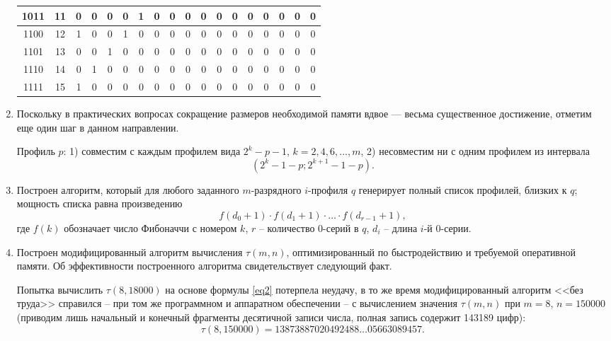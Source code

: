 \begin{enumerate}
\begin{table}[ht]
\begin{tabular}{*{18}{|c}|}
\hline
{1011} & 11 & 0 & 0 & 0 & 0 & 1 & 0 & 0 & 0 & 0 & 0 & 0 & 0 & 0 & 0 & 0 & 0 \\
\hline
{1100} & 12 & 1 & 0 & 0 & 1 & 0 & 0 & 0 & 0 & 0 & 0 & 0 & 0 & 0 & 0 & 0 & 0 \\
\hline
{1101} & 13 & 0 & 0 & 1 & 0 & 0 & 0 & 0 & 0 & 0 & 0 & 0 & 0 & 0 & 0 & 0 & 0 \\
\hline
{1110} & 14 & 0 & 1 & 0 & 0 & 0 & 0 & 0 & 0 & 0 & 0 & 0 & 0 & 0 & 0 & 0 & 0 \\
\hline
{1111} & 15 & 1 & 0 & 0 & 0 & 0 & 0 & 0 & 0 & 0 & 0 & 0 & 0 & 0 & 0 & 0 & 0 \\
\hline 
\end{tabular}
\end{table}

\item
Поскольку в практических вопросах сокращение размеров необходимой памяти вдвое --- весьма существенное достижение, отметим еще один шаг в данном направлении.

Профиль $p$: 
1) совместим с каждым профилем вида $2^k-p-1$, $k=2,4,6,\dots,m$,
2) несовместим ни с одним профилем из интервала
$$(2^k-1-p ; 2^{k+1}-1-p).$$

\item
Построен алгоритм, который для любого заданного $m$-разрядного $i$-профиля $q$ генерирует полный список профилей, близких к $q$;\\
мощность списка равна произведению
$$f(d_0+1) \cdot  f(d_1+1)\cdot \dots \cdot  f(d_{r-1}+1),$$
где $f(k)$ обозначает число Фибоначчи с номером $k$, $r$ -- количество 0-серий в $q$, $d_i$ -- длина $i$-й 0-серии.
\item 
Построен модифицированный алгоритм вычисления $\tau(m,n)$, оптимизированный по быстродействию и требуемой оперативной памяти.
Об эффективности построенного алгоритма свидетельствует следующий факт.

Попытка вычислить $\tau(8,18000)$ на основе формулы \eqref{eq2} потерпела неудачу, в то же время модифицированный алгоритм <<без труда>> справился -- при том же программном и аппаратном обеспечении -- с вычислением значения $\tau(m,n)$ при $m=8$, $n=150000$ (приводим лишь начальный и конечный фрагменты десятичной записи числа, полная запись содержит 143189 цифр):
$$\tau(8,150000)=13873887020492488 \dots 05663089457. $$

\end{enumerate}

